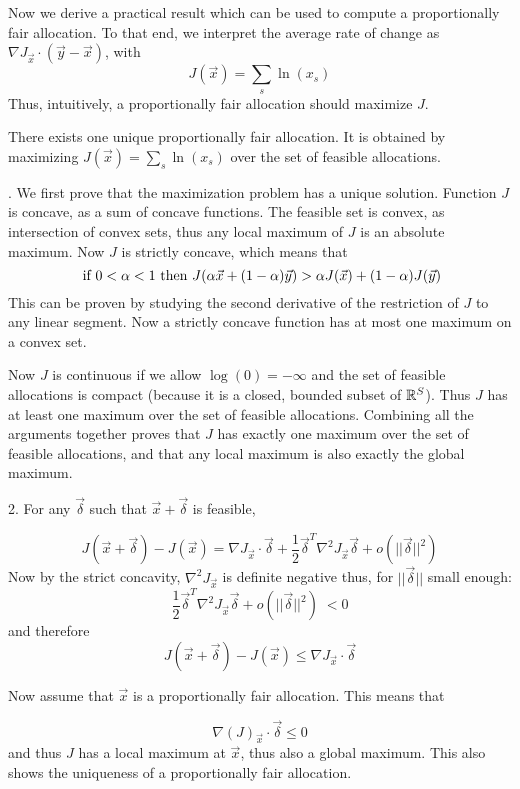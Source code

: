 Now we derive a practical result which can be used to compute
a proportionally fair allocation.  To that end, we interpret
the average rate of change as $\nabla J_{\vec{x}}\cdot
(\vec{y}-\vec{x})$, with
$$
J(\vec{x})= \sum_{s} \ln(x_{s})
$$
Thus, intuitively, a proportionally fair allocation should
maximize $J$.
\begin{theorem}
There exists one unique proportionally fair allocation. It is
obtained by maximizing $J(\vec{x})= \sum_{s} \ln(x_{s})$ over
the set of feasible allocations.
        \label{theo-pf}
\end{theorem}
. We first prove that the maximization problem has a unique
solution.  Function $J$ is concave, as a sum of concave
functions. The feasible set is convex, as intersection of
convex sets, thus any local maximum of $J$ is an absolute
maximum.  Now $J$ is strictly concave, which means that
$$\textrm{ if } 0< \alpha< 1 \textrm{ then } J(\alpha \vec{x}
+ (1-\alpha) \vec{y}) > \alpha J(\vec{x}) + (1-\alpha)
J(\vec{y})
$$
This can be proven by studying the second derivative
of the restriction of $J$ to any linear segment.  Now
a strictly concave function has at most one maximum on
a convex set. %

Now $J$ is continuous if we allow $\log(0)=-\infty$ and the
set of feasible allocations is compact (because it is a
closed, bounded subset of $\Bbb{R}^S$). Thus $J$ has at least
one maximum over the set of feasible allocations.
Combining all the arguments together proves that $J$ has
exactly one maximum over the set of feasible allocations, and
that any local maximum is also exactly the global maximum.

2. For any $\vec{\delta}$ such that $\vec{x}+ \vec{\delta}$
is feasible,

$$
J(\vec{x}+ \vec{\delta})-J(\vec{x})=\nabla J_{\vec{x}}\cdot
\vec{\delta} + \frac{1}{2}   \vec{\delta}^T \nabla^2
J_{\vec{x}} \vec{\delta} +  o(||\vec{\delta}||^2)
$$
Now by the strict concavity, $\nabla^2 J_{\vec{x}}$ is
definite negative thus, for
$||\vec{\delta}||$ small enough:
$$\frac{1}{2}  \vec{\delta}^T \nabla^2
J_{\vec{x}} \vec{\delta} +  o(||\vec{\delta}||^2) \; <0 $$
and therefore
$$
J(\vec{x}+ \vec{\delta})-J(\vec{x})\leq \nabla J_{\vec{x}}\cdot
\vec{\delta}
$$


Now assume that $\vec{x}$ is a proportionally fair allocation.
This means that

$$\nabla(J)_{\vec{x}}\cdot \vec{\delta} \leq 0$$
and thus $J$ has a local maximum at $\vec{x}$, thus also a
global maximum. This also shows the uniqueness of a
proportionally fair allocation.


